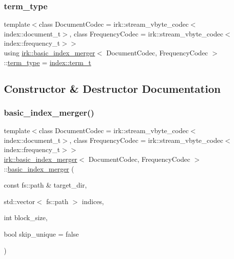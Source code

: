 \subsubsection{\texorpdfstring{term\+\_\+type}{term\_type}}
{\footnotesize\ttfamily template$<$class Document\+Codec  = irk\+::stream\+\_\+vbyte\+\_\+codec$<$index\+::document\+\_\+t$>$, class Frequency\+Codec  = irk\+::stream\+\_\+vbyte\+\_\+codec$<$index\+::frequency\+\_\+t$>$$>$ \\
using \mbox{\hyperlink{classirk_1_1basic__index__merger}{irk\+::basic\+\_\+index\+\_\+merger}}$<$ Document\+Codec, Frequency\+Codec $>$\+::\mbox{\hyperlink{classirk_1_1basic__index__merger_af5d70e8a911f2b291337d008358fd15e}{term\+\_\+type}} =  \mbox{\hyperlink{namespaceirk_1_1index_a7c2517c1f98e5b5f30ba3ab2f837caf6}{index\+::term\+\_\+t}}}



\subsection{Constructor \& Destructor Documentation}
\mbox{\label{classirk_1_1basic__index__merger_ade68b591a43b8e56e32fed169205c33a}} 
\subsubsection{\texorpdfstring{basic\+\_\+index\+\_\+merger()}{basic\_index\_merger()}}
{\footnotesize\ttfamily template$<$class Document\+Codec  = irk\+::stream\+\_\+vbyte\+\_\+codec$<$index\+::document\+\_\+t$>$, class Frequency\+Codec  = irk\+::stream\+\_\+vbyte\+\_\+codec$<$index\+::frequency\+\_\+t$>$$>$ \\
\mbox{\hyperlink{classirk_1_1basic__index__merger}{irk\+::basic\+\_\+index\+\_\+merger}}$<$ Document\+Codec, Frequency\+Codec $>$\+::\mbox{\hyperlink{classirk_1_1basic__index__merger}{basic\+\_\+index\+\_\+merger}} (\begin{DoxyParamCaption}\item[{const fs\+::path \&}]{target\+\_\+dir,  }\item[{std\+::vector$<$ fs\+::path $>$}]{indices,  }\item[{int}]{block\+\_\+size,  }\item[{bool}]{skip\+\_\+unique = {\ttfamily false} }\end{DoxyParamCaption})\hspace{0.3cm}{\ttfamily [inline]}}



